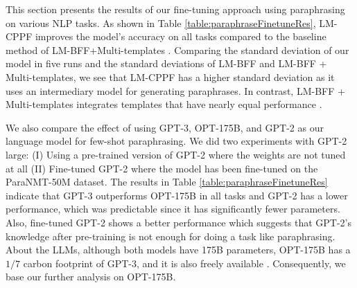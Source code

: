 \documentclass[11pt]{article}
\begin{document}
This section presents the results of our fine-tuning approach using paraphrasing on various NLP tasks. As shown in Table \ref{table:paraphraseFinetuneRes}, LM-CPPF improves the model's accuracy on all tasks compared to the baseline method of LM-BFF+Multi-templates \cite{jian-etal-2022-contrastive}. Comparing the standard deviation of our model in five runs and the standard deviations of LM-BFF and LM-BFF + Multi-templates, we see that LM-CPPF has a higher standard deviation as it uses an intermediary model for generating paraphrases. In contrast, LM-BFF + Multi-templates integrates templates that have nearly equal performance \cite{jian-etal-2022-contrastive}.

We also compare the effect of using GPT-3, OPT-175B, and GPT-2 as our language model for few-shot paraphrasing. We did two experiments with GPT-2 large: (I) Using a pre-trained version of GPT-2 where the weights are not tuned at all (II) Fine-tuned GPT-2 where the model has been fine-tuned on the ParaNMT-50M dataset. The results in Table \ref{table:paraphraseFinetuneRes} indicate that GPT-3 outperforms OPT-175B in all tasks and GPT-2 has a lower performance, which was predictable since it has significantly fewer parameters. Also, fine-tuned GPT-2 shows a better performance which suggests that GPT-2's knowledge after pre-training is not enough for doing a task like paraphrasing. About the LLMs, although both models have 175B parameters, OPT-175B has a $1/7$ carbon footprint of GPT-3, and it is also freely available \cite{zhang2022opt}. Consequently, we base our further analysis on OPT-175B.
\end{document}
